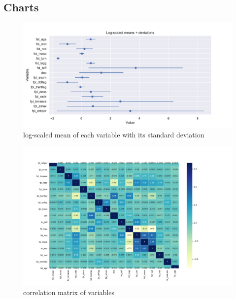 \documentclass[12p]{article}
\begin{document}
\begin{landscape}
    \newpage
    \section{Charts}
    \begin{figure}[!ht]\centering
        \includegraphics[width=1.5\textwidth]{graphics/mean_deviation.pdf}
        \caption{log-scaled mean of each variable with its standard deviation}
        \label{pic:mean}
    \end{figure}
    
    \begin{figure}[!ht]\centering
        \includegraphics[width=1.8\textwidth]{graphics/correlation_matrix.pdf}
        \caption{correlation matrix of variables}
        \label{pic:corr}
    \end{figure}
\end{landscape}
\end{document}
